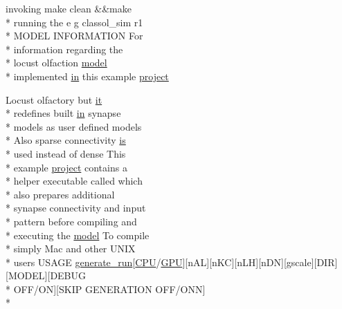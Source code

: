 \begin{DoxyCompactItemize}
invoking make clean \&\&make \\*
running the e g classol\+\_\+sim r1 \\*
M\+O\+D\+E\+L I\+N\+F\+O\+R\+M\+A\+T\+I\+O\+N For \\*
information regarding the \\*
locust olfaction \hyperlink{README_8txt_a69fd801b7213948c12d9dd7eebb3ed14}{model} \\*
implemented \hyperlink{README_8txt_a148897a6b2cc9cff25af80abb13426b0}{in} this example \hyperlink{userproject_2MBody__userdef__project_2README_8txt_a0479123d57feed09329a386ae49747e4}{project}
\item 
Locust olfactory but \hyperlink{userproject_2PoissonIzh__project_2README_8txt_a3e3bbb6c9b14c38757cf273a117e43e8}{it} \\*
redefines built \hyperlink{README_8txt_a148897a6b2cc9cff25af80abb13426b0}{in} synapse \\*
models as user defined models \\*
Also sparse connectivity \hyperlink{userproject_2MBody__userdef__project_2README_8txt_a7b4e6cf78d14ce882cb8ff127e01babd}{is} \\*
used instead of dense This \\*
example \hyperlink{userproject_2SynDelay__project_2README_8txt_a762c750134e07a31b7965860fd292b51}{project} contains a \\*
helper executable called which \\*
also prepares additional \\*
synapse connectivity and input \\*
pattern before compiling and \\*
executing the \hyperlink{README_8txt_a69fd801b7213948c12d9dd7eebb3ed14}{model} To compile \\*
simply Mac and other U\+N\+I\+X \\*
users U\+S\+A\+G\+E \hyperlink{userproject_2MBody__userdef__project_2README_8txt_a320a215d1e27b4de394be70e90d22863}{generate\+\_\+run}\mbox{[}\hyperlink{README_8txt_a74a069e3c75797de2636c4dd14daa147}{C\+P\+U}/\hyperlink{modelSpec_8h_a39cb9803524b6f3b783344b2f89867b4}{G\+P\+U}\mbox{]}\mbox{[}n\+A\+L\mbox{]}\mbox{[}n\+K\+C\mbox{]}\mbox{[}n\+L\+H\mbox{]}\mbox{[}n\+D\+N\mbox{]}\mbox{[}gscale\mbox{]}\mbox{[}D\+I\+R\mbox{]}\mbox{[}M\+O\+D\+E\+L\mbox{]}\mbox{[}D\+E\+B\+U\+G \\*
O\+F\+F/O\+N\mbox{]}\mbox{[}S\+K\+I\+P G\+E\+N\+E\+R\+A\+T\+I\+O\+N O\+F\+F/O\+N\+N\mbox{]} \\*

\end{DoxyCompactItemize}
